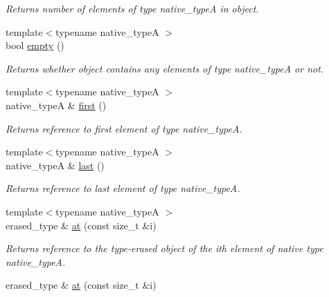 \begin{DoxyCompactItemize}
\begin{DoxyCompactList}\small\item\em Returns number of elements of type native\+\_\+type\+A in object. \end{DoxyCompactList}\item 
\hypertarget{classheterogeneous_1_1adaptor_a0ed6323a271c780579af055e9b7d3352}{}{\footnotesize template$<$typename native\+\_\+type\+A $>$ }\\bool \hyperlink{classheterogeneous_1_1adaptor_a0ed6323a271c780579af055e9b7d3352}{empty} ()\label{classheterogeneous_1_1adaptor_a0ed6323a271c780579af055e9b7d3352}

\begin{DoxyCompactList}\small\item\em Returns whether object contains any elements of type native\+\_\+type\+A or not. \end{DoxyCompactList}\item 
{\footnotesize template$<$typename native\+\_\+type\+A $>$ }\\native\+\_\+type\+A \& \hyperlink{classheterogeneous_1_1adaptor_aecda6883cc85e9b3b1512f75eb41afd0}{first} ()
\begin{DoxyCompactList}\small\item\em Returns reference to first element of type native\+\_\+type\+A. \end{DoxyCompactList}\item 
{\footnotesize template$<$typename native\+\_\+type\+A $>$ }\\native\+\_\+type\+A \& \hyperlink{classheterogeneous_1_1adaptor_ae3aba48b5e083029419a076bcf4e7ee4}{last} ()
\begin{DoxyCompactList}\small\item\em Returns reference to last element of type native\+\_\+type\+A. \end{DoxyCompactList}\item 
{\footnotesize template$<$typename native\+\_\+type\+A $>$ }\\erased\+\_\+type \& \hyperlink{classheterogeneous_1_1adaptor_a902b161fe63bc088e1665dba37068c24}{at} (const size\+\_\+t \&i)
\begin{DoxyCompactList}\small\item\em Returns reference to the type-\/erased object of the ith element of native type native\+\_\+type\+A. \end{DoxyCompactList}\item 
erased\+\_\+type \& \hyperlink{classheterogeneous_1_1adaptor_ab34b90fdb22a2523c1a305410f8dd468}{at} (const size\+\_\+t \&i)

\end{DoxyCompactItemize}
